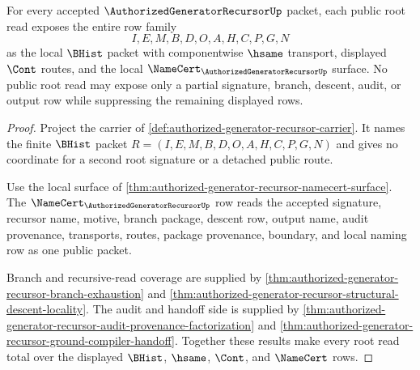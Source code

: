 \begin{theorem}
\label{thm:authorized-generator-recursor-root-signature-row-totality}
For every accepted $\AuthorizedGeneratorRecursorUp$ packet, each public root
read exposes the entire row family
$$
I,E,M,B,D,O,A,H,C,P,G,N
$$
as the local $\BHist$ packet with componentwise $\hsame$ transport, displayed
$\Cont$ routes, and the local $\NameCert_{\AuthorizedGeneratorRecursorUp}$
surface. No public root read may expose only a partial signature, branch,
descent, audit, or output row while suppressing the remaining displayed rows.
\end{theorem}
\begin{proof}
Project the carrier of
\autoref{def:authorized-generator-recursor-carrier}. It names the finite
$\BHist$ packet $R=(I,E,M,B,D,O,A,H,C,P,G,N)$ and gives no coordinate for a
second root signature or a detached public route.

Use the local surface of
\autoref{thm:authorized-generator-recursor-namecert-surface}. The
$\NameCert_{\AuthorizedGeneratorRecursorUp}$ row reads the accepted signature,
recursor name, motive, branch package, descent row, output name, audit
provenance, transports, routes, package provenance, boundary, and local naming
row as one public packet.

Branch and recursive-read coverage are supplied by
\autoref{thm:authorized-generator-recursor-branch-exhaustion} and
\autoref{thm:authorized-generator-recursor-structural-descent-locality}. The
audit and handoff side is supplied by
\autoref{thm:authorized-generator-recursor-audit-provenance-factorization} and
\autoref{thm:authorized-generator-recursor-ground-compiler-handoff}. Together
these results make every root read total over the displayed $\BHist$,
$\hsame$, $\Cont$, and $\NameCert$ rows.
\end{proof}

